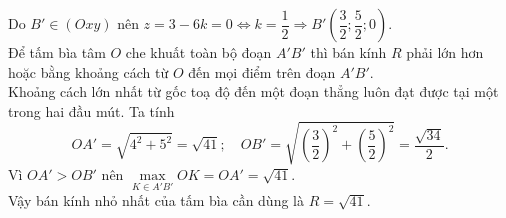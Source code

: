 \begin{ex}
{\begin{itemchoice}
{
}
Do $B' \in (Oxy)$ nên $z = 3-6k=0 \Leftrightarrow k=\dfrac{1}{2} \Rightarrow B'\left(\dfrac{3}{2}; \dfrac{5}{2}; 0\right)$.\\
Để tấm bìa tâm $O$ che khuất toàn bộ đoạn $A'B'$ thì bán kính $R$ phải lớn hơn hoặc bằng khoảng cách từ $O$ đến mọi điểm trên đoạn $A'B'$.\\
Khoảng cách lớn nhất từ gốc toạ độ đến một đoạn thẳng luôn đạt được tại một trong hai đầu mút. Ta tính
$$ OA' = \sqrt{4^2 + 5^2} = \sqrt{41}; \quad OB' = \sqrt{\left(\dfrac{3}{2}\right)^2 + \left(\dfrac{5}{2}\right)^2} = \dfrac{\sqrt{34}}{2}. $$
Vì $OA' > OB'$ nên $\max\limits_{K \in A'B'} OK = OA' = \sqrt{41}$.\\
Vậy bán kính nhỏ nhất của tấm bìa cần dùng là $R = \sqrt{41}$.
		\end{itemchoice}
	}
\end{ex}
